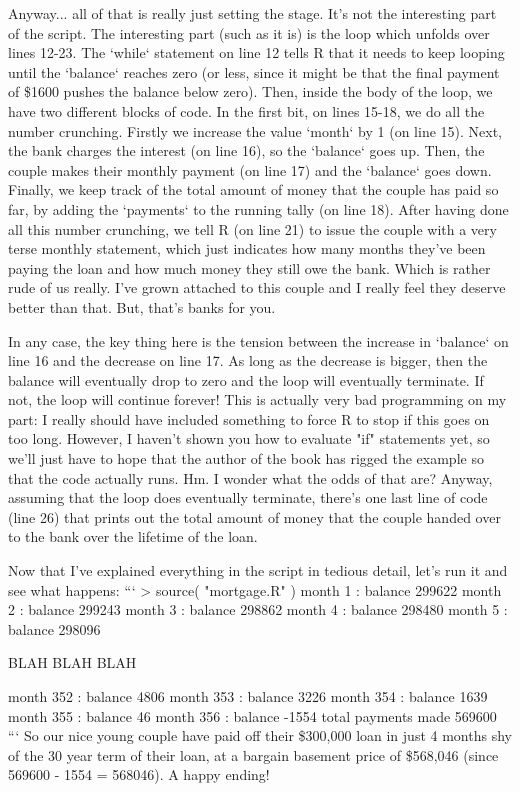 Anyway... all of that is really just setting the stage. It's not the interesting part of the script. The interesting part (such as it is) is the loop which unfolds over lines 12-23. The `while` statement on line 12 tells R that it needs to keep looping until the `balance` reaches zero (or less, since it might be that the final payment of \$1600 pushes the balance below zero). Then, inside the body of the loop, we have two different blocks of code. In the first bit, on lines 15-18, we do all the number crunching. Firstly we increase the value `month` by 1 (on line 15). Next, the bank charges the interest (on line 16), so the `balance` goes up. Then, the couple makes their monthly payment (on line 17) and the `balance` goes down. Finally, we keep track of the total amount of money that the couple has paid so far, by adding the `payments` to the running tally (on line 18). After having done all this number crunching, we tell R  (on line 21) to issue the couple with a very terse monthly statement, which just indicates how many months they've been paying the loan and how much money they still owe the bank. Which is rather rude of us really. I've grown attached to this couple and I really feel they deserve better than that. But, that's banks for you.

In any case, the key thing here is the tension between the increase in `balance` on line 16 and the decrease on line 17. As long as the decrease is bigger, then the balance will eventually drop to zero and the loop will eventually terminate. If not, the loop will continue forever! This is actually very bad programming on my part: I really should have included something to force R to stop if this goes on too long. However, I haven't shown you how to evaluate "if" statements yet, so we'll just have to hope that the author of the book has rigged the example so that the code actually runs. Hm. I wonder what the odds of that are? Anyway, assuming that the loop does eventually terminate, there's one last line of code (line 26) that prints out the total amount of money that the couple handed over to the bank over the lifetime of the loan. 

Now that I've explained everything in the script in tedious detail, let's run it and see what happens:
```
> source( "mortgage.R" )
month 1 : balance 299622 
month 2 : balance 299243 
month 3 : balance 298862 
month 4 : balance 298480 
month 5 : balance 298096 

BLAH BLAH BLAH

month 352 : balance 4806 
month 353 : balance 3226 
month 354 : balance 1639 
month 355 : balance 46 
month 356 : balance -1554 
total payments made 569600 
```
So our nice young couple have paid off their \$300,000 loan in just 4 months shy of the 30 year term of their loan, at a bargain basement price of \$568,046 (since  569600 - 1554 = 568046). A happy ending!


